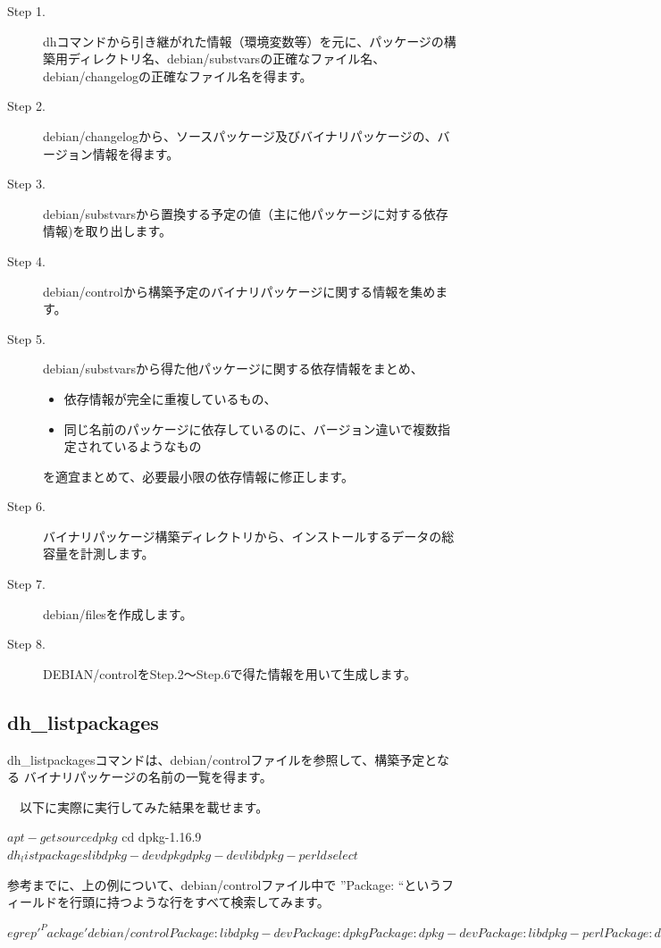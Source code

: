 \documentclass[mingoth,a4paper]{jsarticle}
\begin{document}
\begin{description}
\item [Step 1.] dhコマンドから引き継がれた情報（環境変数等）を元に、パッケージの構築用ディレクトリ名、debian/substvarsの正確なファイル名、debian/changelogの正確なファイル名を得ます。
\item [Step 2.] debian/changelogから、ソースパッケージ及びバイナリパッケージの、バージョン情報を得ます。
\item [Step 3.] debian/substvarsから置換する予定の値（主に他パッケージに対する依存情報)を取り出します。
\item [Step 4.] debian/controlから構築予定のバイナリパッケージに関する情報を集めます。
\item [Step 5.] debian/substvarsから得た他パッケージに関する依存情報をまとめ、
  \begin{itemize}
    \item 依存情報が完全に重複しているもの、
    \item 同じ名前のパッケージに依存しているのに、バージョン違いで複数指定されているようなもの
  \end{itemize}
  を適宜まとめて、必要最小限の依存情報に修正します。
\item [Step 6.] バイナリパッケージ構築ディレクトリから、インストールするデータの総容量を計測します。
\item [Step 7.] debian/filesを作成します。
\item [Step 8.] DEBIAN/controlをStep.2〜Step.6で得た情報を用いて生成します。
\end{description} 

\subsection{dh\_listpackages}

 dh\_listpackagesコマンドは、debian/controlファイルを参照して、構築予定となる
バイナリパッケージの名前の一覧を得ます。

　以下に実際に実行してみた結果を載せます。

\begin{commandline}
$ apt-get source dpkg
$ cd dpkg-1.16.9
$ dh_listpackages
libdpkg-dev
dpkg
dpkg-dev
libdpkg-perl
dselect
$
\end{commandline}

参考までに、上の例について、debian/controlファイル中で
''Package: ``というフィールドを行頭に持つような行をすべて検索してみます。

\begin{commandline}
$ egrep '^Package' debian/control
Package: libdpkg-dev
Package: dpkg
Package: dpkg-dev
Package: libdpkg-perl
Package: dselect
$ 
\end{commandline}
\end{document}
